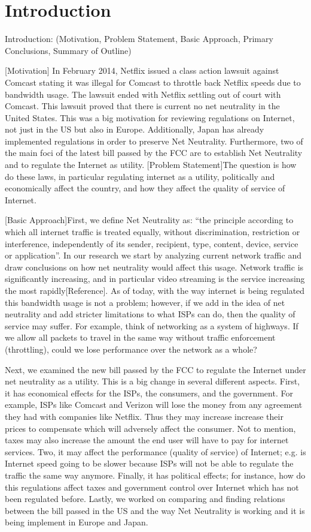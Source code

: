 \documentclass{sigcomm-alternate}
\begin{document}
\section{Introduction}
Introduction: (Motivation, Problem Statement, Basic Approach, Primary Conclusions, Summary of Outline)

[Motivation] In February 2014, Netflix issued a class action lawsuit against Comcast stating it was illegal for Comcast to throttle back Netflix speeds due to bandwidth usage.  The lawsuit ended with Netflix settling out of court with Comcast. This lawsuit proved that there is current no net neutrality in the United States. This was a big motivation for reviewing regulations on Internet, not just in the US but also in Europe. Additionally, Japan has already implemented regulations in order to preserve Net Neutrality. Furthermore, two of the main foci of the latest bill passed by the FCC are to establish Net Neutrality and to regulate the Internet as utility. [Problem Statement]The question is how do these laws, in particular regulating internet as a utility, politically and economically affect the country, and how they affect the quality of service of Internet. 

[Basic Approach]First, we define Net Neutrality as: “the principle according to which all internet traffic is treated equally, without discrimination, restriction or interference, independently of its sender, recipient, type, content, device, service or application”. In our research we start by analyzing current network traffic and draw conclusions on how net neutrality would affect this usage. Network traffic is significantly increasing, and in particular video streaming is the service increasing the most rapidly[Reference]. As of today, with the way internet is being regulated this bandwidth usage is not a problem; however, if we add in the idea of net neutrality and add stricter limitations to what ISPs can do, then the quality of service may suffer.  For example, think of networking as a system of highways. If we allow all packets to travel in the same way without traffic enforcement (throttling), could we lose performance over the network as a whole?

Next, we examined the new bill passed by the FCC to regulate the Internet under net neutrality as a utility. This is a big change in several different aspects. First, it has economical effects for the ISPs, the consumers, and the government. For example, ISPs like Comcast and Verizon will lose the money from any agreement they had with companies like Netflix.  Thus they may increase increase their prices to compensate which will adversely affect the consumer. Not to mention, taxes may also increase the amount the end user will have to pay for internet services. Two, it may affect the performance (quality of service) of Internet; e.g. is Internet speed going to be slower because ISPs will not be able to regulate the traffic the same way anymore. Finally, it has political effects; for instance, how do this regulations affect taxes and government control over Internet which has not been regulated before. Lastly, we worked on comparing and finding relations between the bill passed in the US and the way Net Neutrality is working and it is being implement in Europe and Japan.
\end{document}
